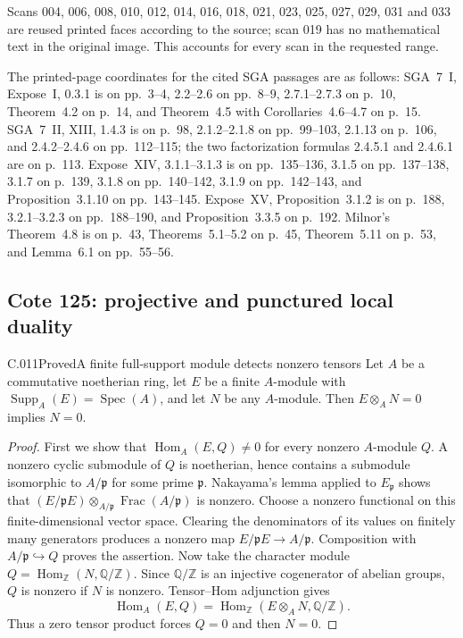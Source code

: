 Scans 004, 006, 008, 010, 012, 014, 016, 018, 021, 023, 025,
027, 029, 031 and 033 are reused printed faces according to the
source; scan 019 has no mathematical text in the original image.
This accounts for every scan in the requested range.

The printed-page coordinates for the cited SGA passages are as follows:
SGA~7~I, Expose~I, 0.3.1 is on pp.~3--4, 2.2--2.6 on
pp.~8--9, 2.7.1--2.7.3 on p.~10, Theorem~4.2 on p.~14,
and Theorem~4.5 with Corollaries~4.6--4.7 on p.~15.
SGA~7~II, XIII, 1.4.3 is on p.~98, 2.1.2--2.1.8 on
pp.~99--103, 2.1.13 on p.~106, and 2.4.2--2.4.6 on
pp.~112--115; the two factorization formulas 2.4.5.1 and
2.4.6.1 are on p.~113. Expose~XIV, 3.1.1--3.1.3 is on
pp.~135--136, 3.1.5 on pp.~137--138, 3.1.7 on p.~139,
3.1.8 on pp.~140--142, 3.1.9 on pp.~142--143, and
Proposition~3.1.10 on pp.~143--145. Expose~XV,
Proposition~3.1.2 is on p.~188, 3.2.1--3.2.3 on
pp.~188--190, and Proposition~3.3.5 on p.~192.
Milnor's Theorem~4.8 is on p.~43, Theorems~5.1--5.2 on
p.~45, Theorem~5.11 on p.~53, and Lemma~6.1 on pp.~55--56.

\subsection{Cote 125: projective and punctured local duality}

\begin{saresult}{C.011}{Proved}{A finite full-support module detects nonzero tensors}
Let $A$ be a commutative noetherian ring, let $E$ be a finite $A$-module
with $\operatorname{Supp}_A(E)=\operatorname{Spec}(A)$, and let $N$ be any
$A$-module. Then $E\otimes_A N=0$ implies $N=0$.
\end{saresult}
\begin{proof}
First we show that $\operatorname{Hom}_A(E,Q)\ne0$ for every nonzero
$A$-module $Q$. A nonzero cyclic submodule of $Q$ is noetherian, hence
contains a submodule isomorphic to $A/\mathfrak p$ for some prime
$\mathfrak p$. Nakayama's lemma applied to $E_{\mathfrak p}$ shows that
$(E/\mathfrak pE)\otimes_{A/\mathfrak p}\operatorname{Frac}(A/\mathfrak p)$
is nonzero. Choose a nonzero functional on this finite-dimensional vector
space. Clearing the denominators of its values on finitely many generators
produces a nonzero map $E/\mathfrak pE\to A/\mathfrak p$.
Composition with $A/\mathfrak p\hookrightarrow Q$ proves the assertion.
Now take the character module
$Q=\operatorname{Hom}_{\mathbb Z}(N,\mathbb Q/\mathbb Z)$.
Since $\mathbb Q/\mathbb Z$ is an injective cogenerator of abelian groups,
$Q$ is nonzero if $N$ is nonzero. Tensor--Hom adjunction gives
\[
 \operatorname{Hom}_A(E,Q)
 =\operatorname{Hom}_{\mathbb Z}(E\otimes_A N,\mathbb Q/\mathbb Z).
\]
Thus a zero tensor product forces $Q=0$ and then $N=0$.
\end{proof}

